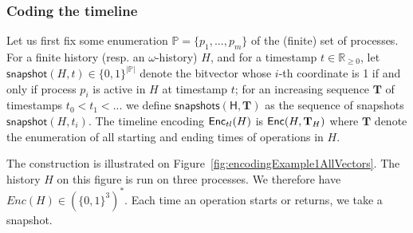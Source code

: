 \subsubsection{Coding the timeline}
Let us first fix some enumeration $\mathbb{P}=\{p_1,...,p_m\}$ of the (finite) set of processes.
For a finite history (resp. an $\omega$-history) $H$, and for a timestamp $t\in \mathbb{R}_{\geq 0}$,
let $\mathsf{snapshot}(H, t)\in\{0,1\}^{|\mathbb{P}|}$ denote the bitvector 
whose $i$-th coordinate is 1 if and only if process $p_i$ is active in $H$ at timestamp $t$;
for an increasing sequence $\mathbf{T}$ of timestamps $t_0<t_1<...$ we define
$\mathsf{snapshots(H,\mathbf{T})}$ as the sequence of snapshots $\mathsf{snapshot}(H, t_i)$.
The timeline encoding $\mathsf{Enc}_{tl}(H)$ is $\mathsf{Enc}(H,\mathbf{T}_H)$ where $\mathbf{T}$ denote the enumeration of all starting and ending times of operations in $H$.

\begin{example}
The construction is illustrated on Figure~\ref{fig:encodingExample1AllVectors}.
The history $H$ on this figure is run on three processes. 
We therefore have $Enc(H)\in (\{0,1\}^3)^*$. Each time an operation starts or returns, we take a snapshot. 
\end{example}

